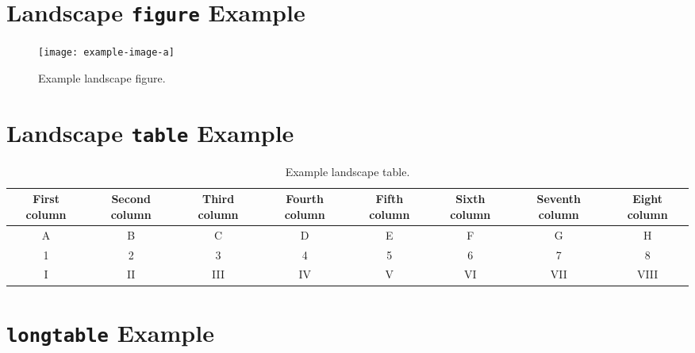 \documentclass{umalayathesis}
\begin{document}
\begin{appendices}
\chapter{Landscape \texttt{figure} Example}\label{app:landscapefigure}

\begin{landscape}
    \begin{figure}[h]
        \centering
        \texttt{[image: example-image-a]}
        \caption{Example landscape figure.}
        \label{fig:landscapefigure}
    \end{figure}
\end{landscape}

\chapter{Landscape \texttt{table} Example}\label{app:landscapetable}

\begin{landscape}
    \begin{table}[h]
        \centering
        \begin{tabular}{cccccccc}
            \hline
            First column & Second column & Third column & Fourth column & Fifth column & Sixth column & Seventh column & Eight column \\
            \hline
            A & B & C & D & E & F & G & H \\
            1 & 2 & 3 & 4 & 5 & 6 & 7 & 8 \\
            I & II & III & IV & V & VI & VII & VIII \\
            \hline
        \end{tabular}
        \caption{Example landscape table.}
        \label{tab:landscapetable}
    \end{table}
\end{landscape}

\chapter{\texttt{longtable} Example}\label{app:longtable}


\end{appendices}
\end{document}
